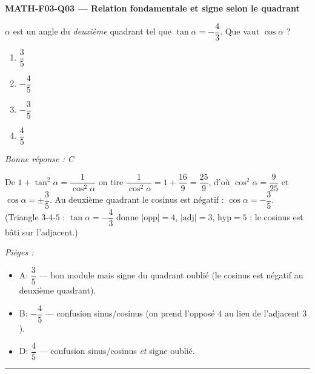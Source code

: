 \documentclass[11pt,a4paper]{article}
\begin{document}
\noindent\textbf{MATH-F03-Q03 --- Relation fondamentale et signe selon le quadrant}\par
$\alpha$ est un angle du \emph{deuxième} quadrant tel que $\tan\alpha=-\dfrac{4}{3}$. Que vaut $\cos\alpha$ ?
\begin{enumerate}[label=\Alph*)]
\item $\dfrac{3}{5}$
\item $-\dfrac{4}{5}$
\item $-\dfrac{3}{5}$
\item $\dfrac{4}{5}$
\end{enumerate}
\textit{Bonne réponse : C}\par
De $1+\tan^2\alpha=\dfrac{1}{\cos^2\alpha}$ on tire $\dfrac{1}{\cos^2\alpha}=1+\dfrac{16}{9}=\dfrac{25}{9}$, d'où $\cos^2\alpha=\dfrac{9}{25}$ et $\cos\alpha=\pm\dfrac{3}{5}$. Au deuxième quadrant le cosinus est négatif : $\cos\alpha=-\dfrac{3}{5}$. (Triangle $3$-$4$-$5$ : $\tan\alpha=-\dfrac43$ donne $|\text{opp}|=4$, $|\text{adj}|=3$, $\text{hyp}=5$ ; le cosinus est bâti sur l'adjacent.)\par
\textit{Pièges :}
\begin{itemize}
\item A: $\dfrac35$ --- bon module mais signe du quadrant oublié (le cosinus est négatif au deuxième quadrant).
\item B: $-\dfrac45$ --- confusion sinus/cosinus (on prend l'opposé $4$ au lieu de l'adjacent $3$).
\item D: $\dfrac45$ --- confusion sinus/cosinus \emph{et} signe oublié.
\end{itemize}
\vspace{8pt}\hrule\vspace{8pt}
\end{document}

